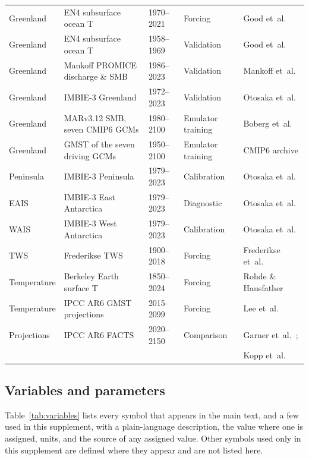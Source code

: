 \documentclass[12pt]{article}
\begin{document}
\begin{landscape}
\begin{table}[!htbp]
\begin{tabular}{lllll}
Greenland & EN4 subsurface ocean T & 1970--2021 & Forcing & Good et~al.~\citeyearpar{Good2013} \\
Greenland & EN4 subsurface ocean T & 1958--1969 & Validation & Good et~al.~\citeyearpar{Good2013} \\
Greenland & Mankoff PROMICE discharge \& SMB & 1986--2023 & Validation & Mankoff et~al.~\citeyearpar{Mankoff2021} \\
Greenland & IMBIE-3 Greenland & 1972--2023 & Validation & Otosaka et~al.~\citeyearpar{Otosaka2026} \\
Greenland & MARv3.12 SMB, seven CMIP6 GCMs & 1980--2100 & Emulator training & Boberg et~al.~\citeyearpar{Boberg2026} \\
Greenland & GMST of the seven driving GCMs & 1950--2100 & Emulator training & CMIP6 archive \\
\midrule
Peninsula & IMBIE-3 Peninsula & 1979--2023 & Calibration & Otosaka et~al.~\citeyearpar{Otosaka2026} \\
EAIS & IMBIE-3 East Antarctica & 1979--2023 & Diagnostic & Otosaka et~al.~\citeyearpar{Otosaka2026} \\
WAIS & IMBIE-3 West Antarctica & 1979--2023 & Calibration & Otosaka et~al.~\citeyearpar{Otosaka2026} \\
\midrule
TWS & Frederikse TWS & 1900--2018 & Forcing & Frederikse et~al.~\citeyearpar{Frederikse2020} \\
\midrule
Temperature & Berkeley Earth surface T & 1850--2024 & Forcing & Rohde \& Hausfather~\citeyearpar{Rohde2020} \\
Temperature & IPCC AR6 GMST projections & 2015--2099 & Forcing & Lee et~al.~\citeyearpar{Lee2021} \\
Projections & IPCC AR6 FACTS & 2020--2150 & Comparison & Garner et~al.~\citeyearpar{Garner2023}; \\
 & & & & Kopp et~al.~\citeyearpar{Kopp2023} \\
\bottomrule
\end{tabular}
\end{table}
\end{landscape}

\FloatBarrier
\subsection{Variables and parameters}
\label{s:variables}

Table~\ref{tab:variables} lists every symbol that appears in the main text, and a few used in this supplement, with a plain-language description, the value where one is assigned, units, and the source of any assigned value. Other symbols used only in this supplement are defined where they appear and are not listed here.
\end{document}
